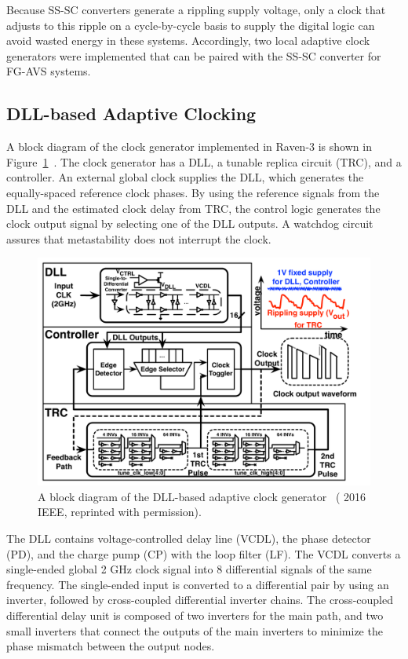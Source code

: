 \documentclass[graybox]{svmult}
\begin{document}
Because SS-SC converters generate a rippling supply voltage, only a clock that adjusts to this ripple on a cycle-by-cycle basis to supply the digital logic can avoid wasted energy in these systems.
Accordingly, two local adaptive clock generators were implemented that can be paired with the SS-SC converter for FG-AVS systems.

\subsection{DLL-based Adaptive Clocking}

A block diagram of the clock generator implemented in Raven-3 is shown in Figure~\ref{fig:clockgen-block}~\cite{Kwak2016}.
The clock generator has a DLL, a tunable replica circuit (TRC), and a controller.
An external global clock supplies the DLL, which generates the equally-spaced reference clock phases.
By using the reference signals from the DLL and the estimated clock delay from TRC, the control logic generates the clock output signal by selecting one of the DLL outputs.
A watchdog circuit assures that metastability does not interrupt the clock.

\begin{figure}
  \centering
  \includegraphics[width=\textwidth]{clockgen-block}
  \caption{A block diagram of the DLL-based adaptive clock generator~\cite{Zimmer2016} ({\textcopyright} 2016 IEEE, reprinted with permission).}
  \label{fig:clockgen-block}
\end{figure}

The DLL contains voltage-controlled delay line (VCDL), the phase detector (PD), and the charge pump (CP) with the loop filter (LF).
The VCDL converts a single-ended global 2 GHz clock signal into 8 differential signals of the same frequency.
The single-ended input is converted to a differential pair by using an inverter, followed by cross-coupled differential inverter chains.
The cross-coupled differential delay unit is composed of two inverters for the main path, and two small inverters that connect the outputs of the main inverters to minimize the phase mismatch between the output nodes.
\end{document}
